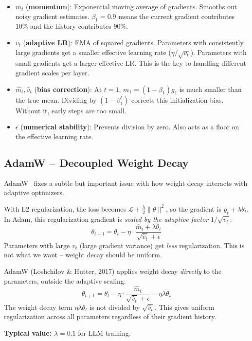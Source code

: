 \newpage
\begin{intuitionbox}
\begin{itemize}
  \item $m_t$ (\textbf{momentum}): Exponential moving average of gradients. Smooths out noisy gradient estimates. $\beta_1 = 0.9$ means the current gradient contributes 10\% and the history contributes 90\%.
  \item $v_t$ (\textbf{adaptive LR}): EMA of squared gradients. Parameters with consistently large gradients get a smaller effective learning rate ($\eta / \sqrt{v_t}$). Parameters with small gradients get a larger effective LR. This is the key to handling different gradient scales per layer.
  \item $\hat{m}_t, \hat{v}_t$ (\textbf{bias correction}): At $t=1$, $m_1 = (1-\beta_1)g_1$ is much smaller than the true mean. Dividing by $(1-\beta_1^t)$ corrects this initialization bias. Without it, early steps are too small.
  \item $\epsilon$ (\textbf{numerical stability}): Prevents division by zero. Also acts as a floor on the effective learning rate.
\end{itemize}
\end{intuitionbox}

\subsection{AdamW -- Decoupled Weight Decay}
\label{adamw-decoupled-weight-decay}

AdamW~\cite{loshchilov2019adamw} fixes a subtle but important issue with how weight decay interacts with adaptive optimizers.

\begin{keybox}
With L2 regularization, the loss becomes $\mathcal{L} + \frac{\lambda}{2}\|\theta\|^2$, so the gradient is $g_t + \lambda \theta_t$. In Adam, this regularization gradient is \emph{scaled by the adaptive factor} $1/\sqrt{\hat{v}_t}$: 
\[
\theta_{t+1} = \theta_t - \eta \cdot \frac{\hat{m}_t + \lambda \theta_t}{\sqrt{\hat{v}_t} + \epsilon}
\]
 Parameters with large $v_t$ (large gradient variance) get \emph{less} regularization. This is not what we want -- weight decay should be uniform.
\end{keybox}

\begin{keybox}
AdamW (Loshchilov \& Hutter, 2017) applies weight decay \emph{directly} to the parameters, outside the adaptive scaling: 
\[
\theta_{t+1} = \theta_t - \eta \cdot \frac{\hat{m}_t}{\sqrt{\hat{v}_t} + \epsilon}
  - \eta \lambda \theta_t
\]
 The weight decay term $\eta \lambda \theta_t$ is not divided by $\sqrt{\hat{v}_t}$. This gives uniform regularization across all parameters regardless of their gradient history.

\textbf{Typical value:} $\lambda = 0.1$ for LLM training.
\end{keybox}

